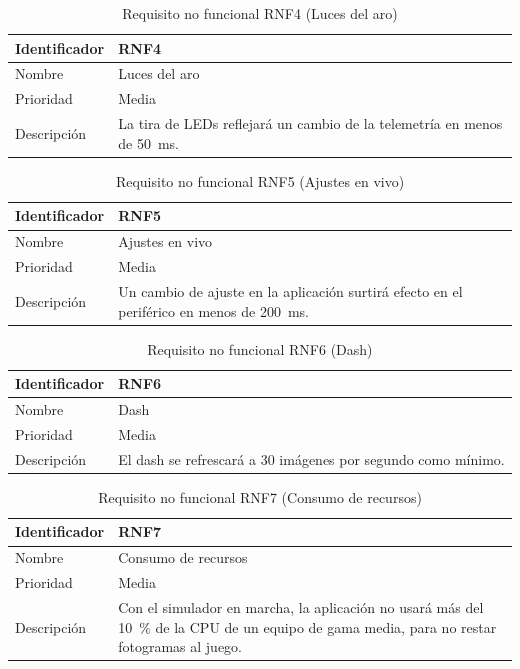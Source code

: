\begin{table}[H]
	\centering
	\renewcommand{\arraystretch}{2}
	\begin{tabular}{|l|p{10cm}|}
		\hline
		Identificador & RNF4 \\
		\hline
		Nombre & Luces del aro \\
		\hline
		Prioridad & Media \\
		\hline
		Descripción & La tira de LEDs reflejará un cambio de la telemetría en menos de 50~ms. \\
		\hline
	\end{tabular}
	\caption{Requisito no funcional RNF4 (Luces del aro)}
	\label{tab:rnf4}
\end{table}

\begin{table}[H]
	\centering
	\renewcommand{\arraystretch}{2}
	\begin{tabular}{|l|p{10cm}|}
		\hline
		Identificador & RNF5 \\
		\hline
		Nombre & Ajustes en vivo \\
		\hline
		Prioridad & Media \\
		\hline
		Descripción & Un cambio de ajuste en la aplicación surtirá efecto en el periférico en menos de 200~ms. \\
		\hline
	\end{tabular}
	\caption{Requisito no funcional RNF5 (Ajustes en vivo)}
	\label{tab:rnf5}
\end{table}

\begin{table}[H]
	\centering
	\renewcommand{\arraystretch}{2}
	\begin{tabular}{|l|p{10cm}|}
		\hline
		Identificador & RNF6 \\
		\hline
		Nombre & Dash \\
		\hline
		Prioridad & Media \\
		\hline
		Descripción & El dash se refrescará a 30 imágenes por segundo como mínimo. \\
		\hline
	\end{tabular}
	\caption{Requisito no funcional RNF6 (Dash)}
	\label{tab:rnf6}
\end{table}

\begin{table}[H]
	\centering
	\renewcommand{\arraystretch}{2}
	\begin{tabular}{|l|p{10cm}|}
		\hline
		Identificador & RNF7 \\
		\hline
		Nombre & Consumo de recursos \\
		\hline
		Prioridad & Media \\
		\hline
		Descripción & Con el simulador en marcha, la aplicación no usará más del 10~\% de la CPU de un equipo de gama media, para no restar fotogramas al juego. \\
		\hline
	\end{tabular}
	\caption{Requisito no funcional RNF7 (Consumo de recursos)}
	\label{tab:rnf7}
\end{table}

